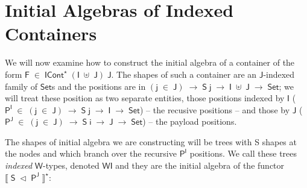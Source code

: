\documentclass[a4paper]{article}
\newcommand{\Conid}[1]{\mathit{#1}}
\newcommand{\Varid}[1]{\mathit{#1}}
\renewcommand\Varid[1]{\mathord{\textsf{#1}}}
\let\Conid\Varid
\begin{document}


\section{Initial Algebras of Indexed Containers}

We will now examine how to construct the initial algebra of a container of the form \ensuremath{\Conid{F}\;\in\;\Conid{ICont}^{\star}\;(\Conid{I}\;\uplus\;\Conid{J})\;\Conid{J}}. The shapes of such a container are an \ensuremath{\Conid{J}}-indexed family of \ensuremath{\Conid{Set}}s and the positions are in \ensuremath{(\Varid{j}\;\in\;\Conid{J})\;\rightarrow\;\Conid{S}\;\Varid{j}\;\rightarrow\;\Conid{I}\;\uplus\;\Conid{J}\;\rightarrow\;\Conid{Set}}; we will treat these position as two separate entities, those positions indexed by \ensuremath{\Conid{I}} (\ensuremath{\Conid{P}^{\Conid{I}}\;\in\;(\Varid{j}\;\in\;\Conid{J})\;\rightarrow\;\Conid{S}\;\Varid{j}\;\rightarrow\;\Conid{I}\;\rightarrow\;\Conid{Set}}) -- the recusive positions -- and those by \ensuremath{\Conid{J}} 
(\ensuremath{\Conid{P}^{\Conid{J}}\;\in\;(\Varid{j}\;\in\;\Conid{J})\;\rightarrow\;\Conid{S}\;\Varid{i}\;\rightarrow\;\Conid{J}\;\rightarrow\;\Conid{Set}}) -- the payload positions.

The shapes of initial algebra we are constructing will be trees with S shapes at the nodes and which branch over the recursive \ensuremath{\Conid{P}^{\Conid{I}}} positions. We call these trees \emph{indexed} \ensuremath{\Conid{W}}-types, denoted \ensuremath{\Conid{WI}} and they are the initial algebra of the functor \ensuremath{\Varid{⟦}\;\Conid{S}\;\lhd\;\Conid{P}^{\Conid{J}}\;\Varid{⟧}^{\star}}:
\end{document}
